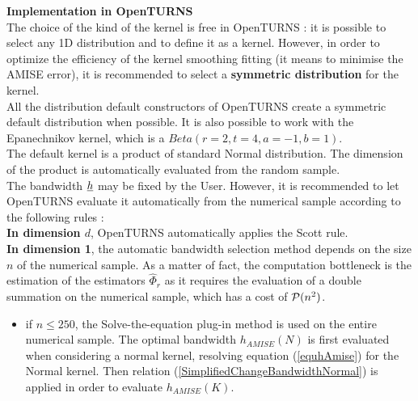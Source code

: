 {  \vspace*{0.5cm}

  \textbf{Implementation in OpenTURNS}\\
  The choice of the kind of the kernel is free in OpenTURNS : it is possible to select any 1D distribution and to define it as a kernel. However, in order to optimize the efficiency of the kernel smoothing fitting (it means to minimise the AMISE error), it is recommended to select a {\bf symmetric distribution} for the kernel. \\
  All the distribution default constructors of OpenTURNS create a symmetric default distribution when possible. It is also possible to work with the Epanechnikov kernel, which is a $Beta(r=2, t=4, a=-1, b=1)$. \\
  The default kernel is a product of standard Normal distribution. The dimension of the product is automatically evaluated from the random sample.\\

  The bandwidth ${\underline{h}}$ may be fixed by the User. However, it is recommended to let OpenTURNS evaluate it automatically from the numerical sample according to the following rules :\\

  {\bf In dimension $d$}, OpenTURNS automatically applies the Scott rule.\\




  {\bf In dimension 1}, the automatic bandwidth selection method depends  on the size $n$ of the numerical sample. As a matter of fact, the computation bottleneck is the estimation of the estimators $\hat{\Phi}_r$ as it requires the evaluation of a double summation on the numerical sample, which has a cost of ${\mathcal P}(n^2)$.
  \begin{itemize}
  \item if $n \leq 250$, the Solve-the-equation  plug-in method is used on the entire numerical sample. The optimal bandwidth $h_{AMISE}(N)$  is first evaluated when considering a normal kernel, resolving equation (\ref{equhAmise}) for the Normal kernel. Then relation (\ref{SimplifiedChangeBandwidthNormal}) is applied in order to evaluate $h_{AMISE}(K)$.


\end{itemize}}

